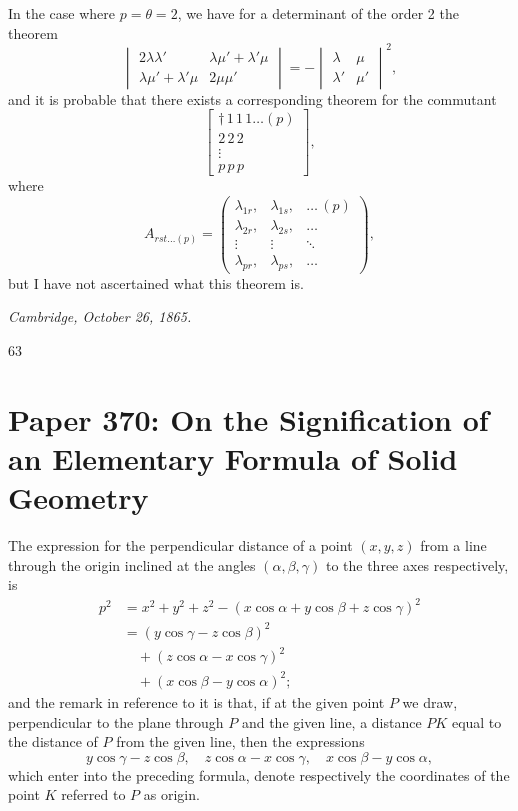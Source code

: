 \documentclass[11pt]{article}
\begin{document}
In the case where $p = \theta = 2$, we have for a determinant of the order 2 the theorem
\[
\begin{vmatrix} 2\lambda\lambda' & \lambda\mu' + \lambda'\mu\\ \lambda\mu' + \lambda'\mu & 2\mu\mu' \end{vmatrix} = -\begin{vmatrix} \lambda & \mu\\ \lambda' & \mu' \end{vmatrix}^{2},
\]
and it is probable that there exists a corresponding theorem for the commutant
\[
\left[\begin{array}{c} \dagger\,1\,1\,1\dots(p)\\ 2\,2\,2\\ \vdots\\ p\,p\,p \end{array}\right],
\]
where
\[
A_{rst\dots(p)} = \begin{pmatrix} \lambda_{1r}, & \lambda_{1s}, & \dots\,(p)\\ \lambda_{2r}, & \lambda_{2s}, & \dots\\ \vdots & \vdots & \ddots\\ \lambda_{pr}, & \lambda_{ps}, & \dots \end{pmatrix},
\]
but I have not ascertained what this theorem is.

\medskip
\noindent\textit{Cambridge, October 26, 1865.}

\hfill 63

\bigskip

\section*{Paper 370: On the Signification of an Elementary Formula of Solid Geometry}

\medskip{}

\medskip
The expression for the perpendicular distance of a point $(x, y, z)$ from a line through the origin inclined at the angles $(\alpha, \beta, \gamma)$ to the three axes respectively, is
\begin{align*}
p^{2} &= x^{2} + y^{2} + z^{2} - (x\cos\alpha + y\cos\beta + z\cos\gamma)^{2}\\
&= (y\cos\gamma - z\cos\beta)^{2}\\
&\quad + (z\cos\alpha - x\cos\gamma)^{2}\\
&\quad + (x\cos\beta - y\cos\alpha)^{2};
\end{align*}
and the remark in reference to it is that, if at the given point $P$ we draw, perpendicular to the plane through $P$ and the given line, a distance $PK$ equal to the distance of $P$ from the given line, then the expressions
\[
y\cos\gamma - z\cos\beta,\quad z\cos\alpha - x\cos\gamma,\quad x\cos\beta - y\cos\alpha,
\]
which enter into the preceding formula, denote respectively the coordinates of the point $K$ referred to $P$ as origin.
\end{document}
